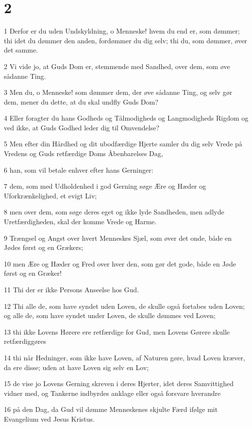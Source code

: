 \chapter{2}

\par 1 Derfor er du uden Undskyldning, o Menneske! hvem du end er, som dømmer; thi idet du dømmer den anden, fordømmer du dig selv; thi du, som dømmer, øver det samme.
\par 2 Vi vide jo, at Guds Dom er, stemmende med Sandhed, over dem, som øve sådanne Ting.
\par 3 Men du, o Menneske! som dømmer dem, der øve sådanne Ting, og selv gør dem, mener du dette, at du skal undfly Guds Dom?
\par 4 Eller foragter du hans Godheds og Tålmodigheds og Langmodigheds Rigdom og ved ikke, at Guds Godhed leder dig til Omvendelse?
\par 5 Men efter din Hårdhed og dit ubodfærdige Hjerte samler du dig selv Vrede på Vredens og Guds retfærdige Doms Åbenbarelses Dag,
\par 6 han, som vil betale enhver efter hans Gerninger:
\par 7 dem, som med Udholdenhed i god Gerning søge Ære og Hæder og Uforkrænkelighed, et evigt Liv;
\par 8 men over dem, som søge deres eget og ikke lyde Sandheden, men adlyde Uretfærdigheden, skal der komme Vrede og Harme.
\par 9 Trængsel og Angst over hvert Menneskes Sjæl, som øver det onde, både en Jødes først og en Grækers;
\par 10 men Ære og Hæder og Fred over hver den, som gør det gode, både en Jøde først og en Græker!
\par 11 Thi der er ikke Persons Anseelse hos Gud.
\par 12 Thi alle de, som have syndet uden Loven, de skulle også fortabes uden Loven; og alle de, som have syndet under Loven, de skulle dømmes ved Loven;
\par 13 thi ikke Lovens Hørere ere retfærdige for Gud, men Lovens Gørere skulle retfærdiggøres
\par 14 thi når Hedninger, som ikke have Loven, af Naturen gøre, hvad Loven kræver, da ere disse; uden at have Loven sig selv en Lov;
\par 15 de vise jo Lovens Gerning skreven i deres Hjerter, idet deres Samvittighed vidner med, og Tankerne indbyrdes anklage eller også forsvare hverandre
\par 16 på den Dag, da Gud vil dømme Menneskenes skjulte Færd ifølge mit Evangelium ved Jesus Kristus.

